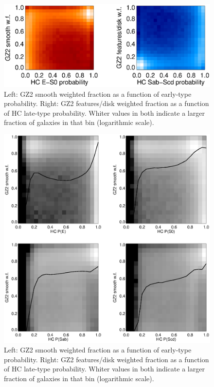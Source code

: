 \documentclass[useAMS,usenatbib]{mn2e}
\begin{document}
\begin{figure}
\includegraphics[angle=0,width=7.0in]{figures/hc_gz2.eps}
\caption{Left: GZ2 smooth weighted fraction as a function of \citet{hue11} early-type probability. Right: GZ2 features/disk weighted fraction as a function of HC late-type probability. Whiter values in both indicate a larger fraction of galaxies in that bin (logarithmic scale).
\label{fig-hc_gz2}}
\end{figure}

\begin{figure}
\includegraphics[angle=0,width=6.0in]{figures/hc_gz2_subclass.eps}
\caption{Left: GZ2 smooth weighted fraction as a function of \citet{hue11} early-type probability. Right: GZ2 features/disk weighted fraction as a function of HC late-type probability. Whiter values in both indicate a larger fraction of galaxies in that bin (logarithmic scale).
\label{fig-hc_gz2_subclass}}
\end{figure}
\end{document}
